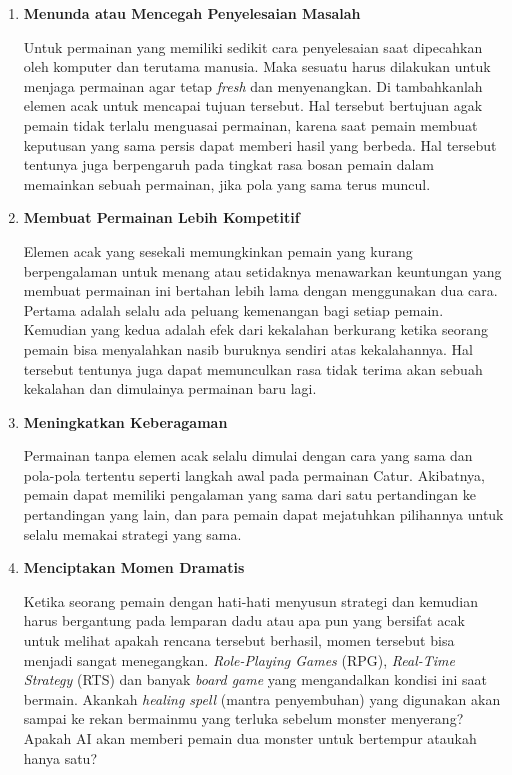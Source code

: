 \begin{enumerate}[label=\textbf{\alph*).}]

	\item \textbf{Menunda atau Mencegah Penyelesaian Masalah}
	\setlength{\parindent}{0.8cm}

	Untuk permainan yang memiliki sedikit cara penyelesaian saat dipecahkan oleh komputer dan terutama manusia. Maka sesuatu harus dilakukan untuk menjaga permainan agar tetap \textit{fresh} dan menyenangkan. Di tambahkanlah elemen acak untuk mencapai tujuan tersebut. Hal tersebut bertujuan agak pemain tidak terlalu menguasai permainan, karena saat pemain membuat keputusan yang sama persis dapat memberi hasil yang berbeda. Hal tersebut tentunya juga berpengaruh pada tingkat rasa bosan pemain dalam memainkan sebuah permainan, jika pola yang sama terus muncul.
	\vspace{1ex}

	\item \textbf{Membuat Permainan Lebih Kompetitif}

	Elemen acak yang sesekali memungkinkan pemain yang kurang berpengalaman untuk menang atau setidaknya menawarkan keuntungan yang membuat permainan ini bertahan lebih lama dengan menggunakan dua cara. Pertama adalah selalu ada peluang kemenangan bagi setiap pemain. Kemudian yang kedua adalah efek dari kekalahan berkurang ketika seorang pemain bisa menyalahkan nasib buruknya sendiri atas kekalahannya. Hal tersebut tentunya juga dapat memunculkan rasa tidak terima akan sebuah kekalahan dan dimulainya permainan baru lagi.
	\vspace{1ex}
	
	\item \textbf{Meningkatkan Keberagaman}

	Permainan tanpa elemen acak selalu dimulai dengan cara yang sama dan pola-pola tertentu seperti langkah awal pada permainan Catur. Akibatnya, pemain dapat memiliki pengalaman yang sama dari satu pertandingan ke pertandingan yang lain, dan para pemain dapat mejatuhkan pilihannya untuk selalu memakai strategi yang sama.
	\vspace{1ex}

	\item \textbf{Menciptakan Momen Dramatis}

	Ketika seorang pemain dengan hati-hati menyusun strategi dan kemudian harus bergantung pada lemparan dadu atau apa pun yang bersifat acak untuk melihat apakah rencana tersebut berhasil, momen tersebut bisa menjadi sangat menegangkan. \textit{Role-Playing Games} (RPG), \textit{Real-Time Strategy} (RTS) dan banyak \textit{board game} yang mengandalkan kondisi ini saat bermain. Akankah \textit{healing spell} (mantra penyembuhan) yang digunakan akan sampai ke rekan bermainmu yang terluka sebelum monster menyerang? Apakah AI akan memberi pemain dua monster untuk bertempur ataukah hanya satu?
	\vspace{1ex}


\end{enumerate}
